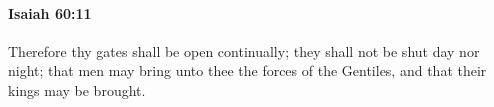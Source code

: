 
		\paragraph{Isaiah 60:11} %
			\label{ISAIAH-60-11}

			Therefore thy gates shall be open continually; they shall not be shut day nor night; that men may bring unto thee the forces of the Gentiles, and that their kings may be brought.


